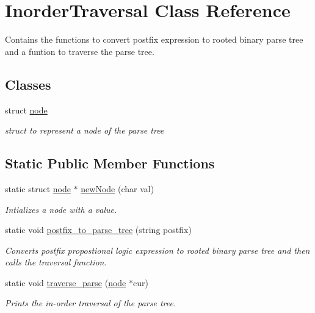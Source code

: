 \hypertarget{class_inorder_traversal}{}\section{Inorder\+Traversal Class Reference}
\label{class_inorder_traversal}


Contains the functions to convert postfix expression to rooted binary parse tree and a funtion to traverse the parse tree.  


\subsection*{Classes}
\begin{DoxyCompactItemize}
\item 
struct \mbox{\hyperlink{struct_inorder_traversal_1_1node}{node}}
\begin{DoxyCompactList}\small\item\em struct to represent a node of the parse tree \end{DoxyCompactList}\end{DoxyCompactItemize}
\subsection*{Static Public Member Functions}
\begin{DoxyCompactItemize}
\item 
static struct \mbox{\hyperlink{struct_inorder_traversal_1_1node}{node}} $\ast$ \mbox{\hyperlink{class_inorder_traversal_afdc83589caa4e0b0fe266cd147ed80c4}{new\+Node}} (char val)
\begin{DoxyCompactList}\small\item\em Intializes a node with a value. \end{DoxyCompactList}\item 
static void \mbox{\hyperlink{class_inorder_traversal_a0997a41c18ddf565f5f460446ef3c8a2}{postfix\+\_\+to\+\_\+parse\+\_\+tree}} (string postfix)
\begin{DoxyCompactList}\small\item\em Converts postfix propostional logic expression to rooted binary parse tree and then calls the traversal function. \end{DoxyCompactList}\item 
static void \mbox{\hyperlink{class_inorder_traversal_a9027f549ca60732409dbe4387785e0a4}{traverse\+\_\+parse}} (\mbox{\hyperlink{struct_inorder_traversal_1_1node}{node}} $\ast$cur)
\begin{DoxyCompactList}\small\item\em Prints the in-\/order traversal of the parse tree. \end{DoxyCompactList}\end{DoxyCompactItemize}


